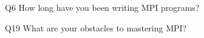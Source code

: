 \begin{description}%
\item{Q6} How long have you been writing MPI programs?%
\item{Q19} What are your obstacles to mastering MPI?%
\end{description}%
